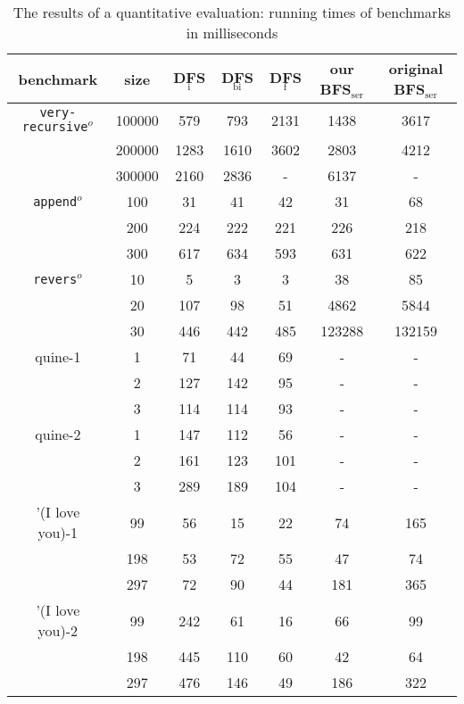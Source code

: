 \documentclass[format=acmlarge, review=true, authordraft=true]{acmart}
\newcommand{\veryrecursiveo}{\texttt{very-recursive$^o$}}
\newcommand{\appendo}{\texttt{append$^o$}}
\newcommand{\reverso}{\texttt{revers$^o$}}
\newcommand{\DFSi }[0]{DFS$_\textrm{i}$}
\newcommand{\DFSf }[0]{DFS$_\textrm{f}$}
\newcommand{\DFSbi}[0]{DFS$_\textrm{bi}$}
\newcommand{\BFSser}[0]{BFS$_\textrm{ser}$}
\begin{document}
\begin{table}
	\begin{tabular}{|c|c|c|c|c|c|c|}
		\hline 
		benchmark & size & \DFSi{} & \DFSbi{} & \DFSf{} & 
		our \BFSser{} & original \BFSser{}  
		\\
		\hline
		\veryrecursiveo & 100000 &  579 &  793 & 2131 & 1438 & 3617 \\
		& 200000 & 1283 & 1610 & 3602 & 2803 & 4212 \\
		& 300000 & 2160 & 2836 &    - & 6137 &    - \\
		\hline 
		\appendo  & 100 &  31 &  41 &  42 &  31 &  68 \\ 
		& 200 & 224 & 222 & 221 & 226 & 218 \\ 
		& 300 & 617 & 634 & 593 & 631 & 622 \\ 
		\hline 
		\reverso & 10 &   5 &   3 &   3 &     38 &     85 \\ 
		& 20 & 107 &  98 &  51 &   4862 &   5844 \\
		& 30 & 446 & 442 & 485 & 123288 & 132159 \\ 
		\hline
		quine-1 & 1 &  71 &  44 & 69 & - & - \\ 
		& 2 & 127 & 142 & 95 & - & - \\ 
		& 3 & 114 & 114 & 93 & - & - \\ 
		\hline
		quine-2 & 1 & 147 & 112 &  56 & - & - \\ 
		& 2 & 161 & 123 & 101 & - & - \\ 
		& 3 & 289 & 189 & 104 & - & - \\ 
		\hline 
		'(I love you)-1 &  99 & 56 & 15 & 22 &  74 & 165 \\ 
		& 198 & 53 & 72 & 55 &  47 &  74 \\
		& 297 & 72 & 90 & 44 & 181 & 365 \\ 
		\hline
		'(I love you)-2 &  99 & 242 &  61 & 16 &  66 &  99 \\ 
		& 198 & 445 & 110 & 60 &  42 &  64 \\
		& 297 & 476 & 146 & 49 & 186 & 322 \\ 
		\hline 
	\end{tabular}
	\caption{The results of a quantitative evaluation: running times of 
	benchmarks 
		in milliseconds}
	\label{compare-efficiency}
\end{table}
\end{document}
